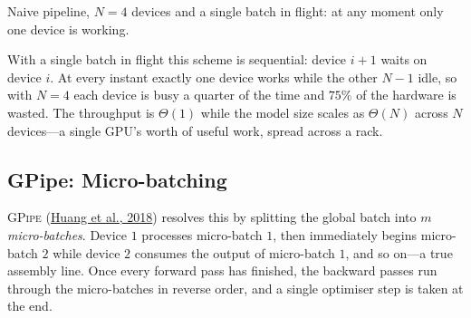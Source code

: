 \documentclass[11pt,a4paper]{article}
\theoremstyle{definition}
\theoremstyle{remark}
\theoremstyle{plain}
\begin{document}
\begin{center}
\begin{tikzpicture}[>=Stealth, font=\small]
\end{tikzpicture}
\par\smallskip
{\small Naive pipeline, $N=4$ devices and a single batch in flight: at
any moment only one device is working.}
\end{center}

With a single batch in flight this scheme is sequential: device $i+1$
waits on device $i$. At every instant exactly one device works while the
other $N-1$ idle, so with $N=4$ each device is busy a quarter of the time
and $75\%$ of the hardware is wasted. The throughput is $\Theta(1)$ while
the model size scales as $\Theta(N)$ across $N$ devices---a single GPU's
worth of useful work, spread across a rack.

\subsection{GPipe: Micro-batching}

\textsc{GPipe} (\href{https://arxiv.org/abs/1811.06965}{Huang et al.,
2018}) resolves this by splitting the global batch into $m$
\emph{micro-batches}. Device $1$ processes micro-batch $1$, then
immediately begins micro-batch $2$ while device $2$ consumes the output of
micro-batch $1$, and so on---a true assembly line. Once every forward pass
has finished, the backward passes run through the micro-batches in
reverse order, and a single optimiser step is taken at the end.
\end{document}
